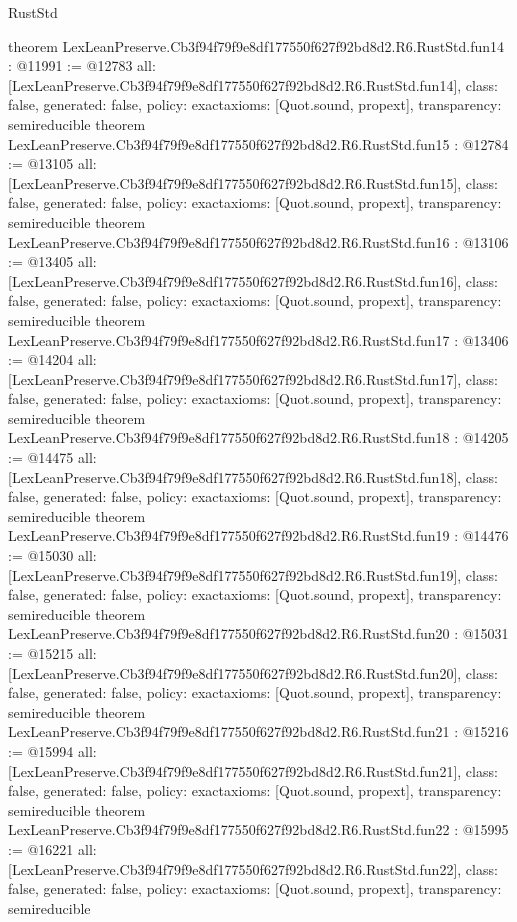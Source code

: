 \begin{lexlean}{RustStd}
\begin{coremodule}
{}
theorem LexLeanPreserve.Cb3f94f79f9e8df177550f627f92bd8d2.R6.RustStd.fun14 : @11991 := @12783 {
  all: [LexLeanPreserve.Cb3f94f79f9e8df177550f627f92bd8d2.R6.RustStd.fun14],
  class: false,
  generated: false,
  policy: exact{axioms: [Quot.sound, propext]},
  transparency: semireducible
}
theorem LexLeanPreserve.Cb3f94f79f9e8df177550f627f92bd8d2.R6.RustStd.fun15 : @12784 := @13105 {
  all: [LexLeanPreserve.Cb3f94f79f9e8df177550f627f92bd8d2.R6.RustStd.fun15],
  class: false,
  generated: false,
  policy: exact{axioms: [Quot.sound, propext]},
  transparency: semireducible
}
theorem LexLeanPreserve.Cb3f94f79f9e8df177550f627f92bd8d2.R6.RustStd.fun16 : @13106 := @13405 {
  all: [LexLeanPreserve.Cb3f94f79f9e8df177550f627f92bd8d2.R6.RustStd.fun16],
  class: false,
  generated: false,
  policy: exact{axioms: [Quot.sound, propext]},
  transparency: semireducible
}
theorem LexLeanPreserve.Cb3f94f79f9e8df177550f627f92bd8d2.R6.RustStd.fun17 : @13406 := @14204 {
  all: [LexLeanPreserve.Cb3f94f79f9e8df177550f627f92bd8d2.R6.RustStd.fun17],
  class: false,
  generated: false,
  policy: exact{axioms: [Quot.sound, propext]},
  transparency: semireducible
}
theorem LexLeanPreserve.Cb3f94f79f9e8df177550f627f92bd8d2.R6.RustStd.fun18 : @14205 := @14475 {
  all: [LexLeanPreserve.Cb3f94f79f9e8df177550f627f92bd8d2.R6.RustStd.fun18],
  class: false,
  generated: false,
  policy: exact{axioms: [Quot.sound, propext]},
  transparency: semireducible
}
theorem LexLeanPreserve.Cb3f94f79f9e8df177550f627f92bd8d2.R6.RustStd.fun19 : @14476 := @15030 {
  all: [LexLeanPreserve.Cb3f94f79f9e8df177550f627f92bd8d2.R6.RustStd.fun19],
  class: false,
  generated: false,
  policy: exact{axioms: [Quot.sound, propext]},
  transparency: semireducible
}
theorem LexLeanPreserve.Cb3f94f79f9e8df177550f627f92bd8d2.R6.RustStd.fun20 : @15031 := @15215 {
  all: [LexLeanPreserve.Cb3f94f79f9e8df177550f627f92bd8d2.R6.RustStd.fun20],
  class: false,
  generated: false,
  policy: exact{axioms: [Quot.sound, propext]},
  transparency: semireducible
}
theorem LexLeanPreserve.Cb3f94f79f9e8df177550f627f92bd8d2.R6.RustStd.fun21 : @15216 := @15994 {
  all: [LexLeanPreserve.Cb3f94f79f9e8df177550f627f92bd8d2.R6.RustStd.fun21],
  class: false,
  generated: false,
  policy: exact{axioms: [Quot.sound, propext]},
  transparency: semireducible
}
theorem LexLeanPreserve.Cb3f94f79f9e8df177550f627f92bd8d2.R6.RustStd.fun22 : @15995 := @16221 {
  all: [LexLeanPreserve.Cb3f94f79f9e8df177550f627f92bd8d2.R6.RustStd.fun22],
  class: false,
  generated: false,
  policy: exact{axioms: [Quot.sound, propext]},
  transparency: semireducible
}
\end{coremodule}
\end{lexlean}
